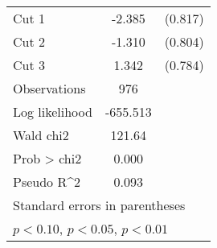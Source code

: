 \begin{table}[htbp]
\begin{tabular}{l*{1}{cc}}
Cut 1               &      -2.385\sym{***}&     (0.817)\\
Cut 2               &      -1.310         &     (0.804)\\
Cut 3               &       1.342\sym{*}  &     (0.784)\\
\hline
Observations        &         976         &            \\
Log likelihood      &    -655.513         &            \\
Wald chi2           &      121.64         &            \\
Prob > chi2         &       0.000         &            \\
Pseudo R^2          &       0.093         &            \\
\hline\hline
\multicolumn{3}{l}{\footnotesize Standard errors in parentheses}\\
\multicolumn{3}{l}{\footnotesize \sym{*} \(p<0.10\), \sym{**} \(p<0.05\), \sym{***} \(p<0.01\)}\\
\end{tabular}
\end{table}
